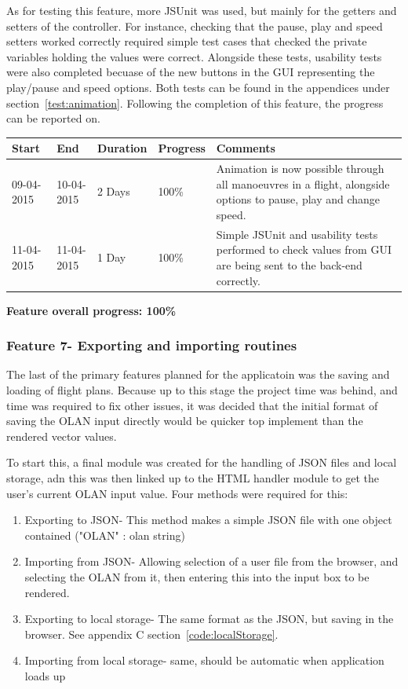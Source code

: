 As for testing this feature, more JSUnit was used, but mainly for the getters and setters of the controller. For instance, checking that the pause, play and speed setters worked correctly required simple test cases that checked the private variables holding the values were correct. Alongside these tests, usability tests were also completed becuase of the new buttons in the GUI representing the play/pause and speed options. Both tests can be found in the appendices under section~\ref{test:animation}. Following the completion of this feature, the progress can be reported on. 

\begin{table}[h]
\begin{tabular}{|l|l|l|l|p{7cm}|}
\hline
\textbf{Start} & \textbf{End} & \textbf{Duration} & \textbf{Progress} & \textbf{Comments}                                                                                                     \\ \hline
09-04-2015     & 10-04-2015   & 2 Days            & 100\%             &  Animation is now possible through all manoeuvres in a flight, alongside options to pause, play and change speed.\\ \hline
11-04-2015     & 11-04-2015   & 1 Day            & 100\%             &  Simple JSUnit and usability tests performed to check values from GUI are being sent to the back-end correctly.\\ \hline
\end{tabular}
\end{table}

\textbf{Feature overall progress: 100\%}

\subsubsection{Feature 7- Exporting and importing routines}
The last of the primary features planned for the applicatoin was the saving and loading of flight plans. Because up to this stage the project time was behind, and time was required to fix other issues, it was decided that the initial format of saving the OLAN input directly would be quicker top implement than the rendered vector values. 

To start this, a final module was created for the handling of JSON files and local storage, adn this was then linked up to the HTML handler module to get the user's current OLAN input value. Four methods were required for this:
\begin{enumerate}
	\item Exporting to JSON- This method makes a simple JSON file with one object contained ("OLAN" : olan string)
	\item Importing from JSON- Allowing selection of a user file from the browser, and selecting the OLAN from it, then entering this into the input box to be rendered.
	\item Exporting to local storage- The same format as the JSON, but saving in the browser. See appendix C section~\ref{code:localStorage}.
	\item Importing from local storage- same, should be automatic when application loads up
\end{enumerate}

